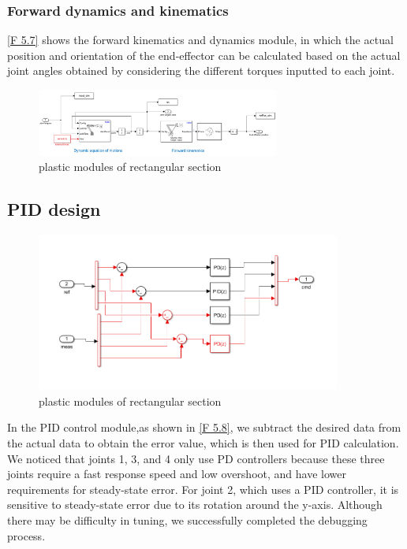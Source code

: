 \subsubsection*{Forward dynamics and kinematics}


\autoref{F 5.7} shows the forward kinematics and dynamics module, in which the actual position and orientation of the end-effector can be calculated based on the actual joint angles obtained by considering the different torques inputted to each joint.

\begin{figure}[htbp]
	\centering
	\includegraphics[width=8cm]{./fig/FDK.png}
	\caption{plastic modules of rectangular section  }
	\label{F 5.7}
\end{figure}


\subsection{PID design}



\begin{figure}[htbp]
	\centering
	\includegraphics[width=10cm]{./fig/PID.png}
	\caption{plastic modules of rectangular section}
	\label{F 5.8}
\end{figure}

In the PID control module,as shown in \autoref{F 5.8}, we subtract the desired data from the actual data to obtain the error value, which is then used for PID calculation. We noticed that joints 1, 3, and 4 only use PD controllers because these three joints require a fast response speed and low overshoot, and have lower requirements for steady-state error. For joint 2, which uses a PID controller, it is sensitive to steady-state error due to its rotation around the y-axis. Although there may be difficulty in tuning, we successfully completed the debugging process.


